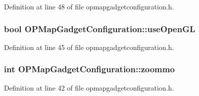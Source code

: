 \-Definition at line 48 of file opmapgadgetconfiguration.\-h.

\hypertarget{group___o_p_map_plugin_gae922073575fb74cc0fa15b73223982ac}{
\subsubsection[{use\-Open\-G\-L}]{\setlength{\rightskip}{0pt plus 5cm}bool {\bf \-O\-P\-Map\-Gadget\-Configuration\-::use\-Open\-G\-L}}}\label{group___o_p_map_plugin_gae922073575fb74cc0fa15b73223982ac}


\-Definition at line 45 of file opmapgadgetconfiguration.\-h.

\hypertarget{group___o_p_map_plugin_gac07e4414a740f31223ffb1ce430ca3e8}{
\subsubsection[{zoommo}]{\setlength{\rightskip}{0pt plus 5cm}int {\bf \-O\-P\-Map\-Gadget\-Configuration\-::zoommo}}}\label{group___o_p_map_plugin_gac07e4414a740f31223ffb1ce430ca3e8}


\-Definition at line 42 of file opmapgadgetconfiguration.\-h.


